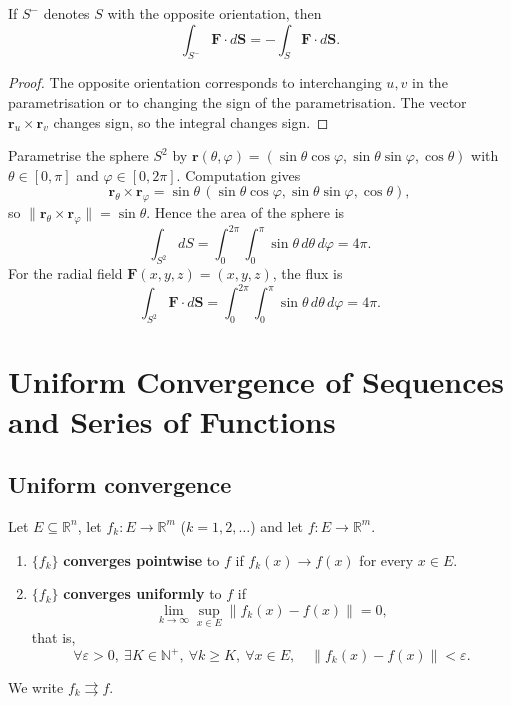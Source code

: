 \begin{proposition}\label{prop:flux_orientation}
If $S^-$ denotes $S$ with the opposite orientation, then
\[
\int_{S^-} \mathbf{F} \cdot d\mathbf{S} = -\int_S \mathbf{F} \cdot d\mathbf{S}.
\]
\end{proposition}

\begin{proof}
The opposite orientation corresponds to interchanging $u, v$ in the parametrisation or to changing the sign of the parametrisation. The vector $\mathbf{r}_u \times \mathbf{r}_v$ changes sign, so the integral changes sign.
\end{proof}

\begin{example}\label{ex:sphere_surface}
Parametrise the sphere $S^2$ by $\mathbf{r}(\theta, \varphi) = (\sin\theta \cos\varphi, \sin\theta \sin\varphi, \cos\theta)$ with $\theta \in [0, \pi]$ and $\varphi \in [0, 2\pi]$. Computation gives
\[
\mathbf{r}_\theta \times \mathbf{r}_\varphi = \sin\theta \, (\sin\theta \cos\varphi, \sin\theta \sin\varphi, \cos\theta),
\]
so $\|\mathbf{r}_\theta \times \mathbf{r}_\varphi\| = \sin\theta$. Hence the area of the sphere is
\[
\int_{S^2} dS = \int_0^{2\pi} \int_0^{\pi} \sin\theta \, d\theta \, d\varphi = 4\pi.
\]
For the radial field $\mathbf{F}(x, y, z) = (x, y, z)$, the flux is
\[
\int_{S^2} \mathbf{F} \cdot d\mathbf{S} = \int_0^{2\pi} \int_0^{\pi} \sin\theta \, d\theta \, d\varphi = 4\pi.
\]
\end{example}

\section{Uniform Convergence of Sequences and Series of Functions}

\subsection{Uniform convergence}

\begin{definition}\label{def:uniform_convergence}
Let $E \subseteq \mathbb{R}^n$, let $f_k: E \to \mathbb{R}^m$ ($k = 1, 2, \dots$) and let $f: E \to \mathbb{R}^m$.
\begin{enumerate}[label=(\roman*)]
    \item $\{f_k\}$ \textbf{converges pointwise} to $f$ if $f_k(x) \to f(x)$ for every $x \in E$.
    \item $\{f_k\}$ \textbf{converges uniformly} to $f$ if
    \[
    \lim_{k \to \infty} \sup_{x \in E} \|f_k(x) - f(x)\| = 0,
    \]
    that is,
    \[
    \forall \varepsilon > 0,\ \exists K \in \mathbb{N}^+,\ \forall k \ge K,\ \forall x \in E,\quad \|f_k(x) - f(x)\| < \varepsilon.
    \]
\end{enumerate}
We write $f_k \rightrightarrows f$.
\end{definition}

